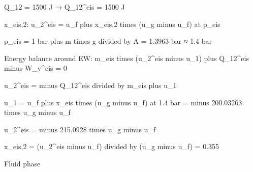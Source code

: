 Q_12 = 1500 J → Q_12^eis = 1500 J  

x_eis,2:  
u_2^eis = u_f plus x_eis,2 times (u_g minus u_f) at p_eis  

p_eis = 1 bar plus m times g divided by A  
= 1.3963 bar  
≈ 1.4 bar  

Energy balance around EW:  
m_eis times (u_2^eis minus u_1) plus Q_12^eis minus W_v^eis = 0  

u_2^eis = minus Q_12^eis divided by m_eis plus u_1  

u_1 = u_f plus x_eis times (u_g minus u_f) at 1.4 bar  
= minus 200.03263 times u_g minus u_f  

u_2^eis = minus 215.0928 times u_g minus u_f  

x_eis,2 = (u_2^eis minus u_f) divided by (u_g minus u_f)  
= 0.355  

Fluid phase